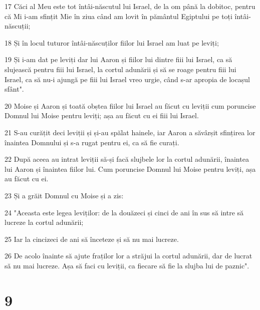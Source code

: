 \par 17 Căci al Meu este tot întâi-născutul lui Israel, de la om până la dobitoc, pentru că Mi i-am sfințit Mie în ziua când am lovit în pământul Egiptului pe toți întâi-născuții;
\par 18 Și în locul tuturor întâi-născuților fiilor lui Israel am luat pe leviți;
\par 19 Și i-am dat pe leviți dar lui Aaron și fiilor lui dintre fiii lui Israel, ca să slujească pentru fiii lui Israel, la cortul adunării și să se roage pentru fiii lui Israel, ca să nu-i ajungă pe fiii lui Israel vreo urgie, când s-ar apropia de locașul sfânt".
\par 20 Moise și Aaron și toată obștea fiilor lui Israel au făcut cu leviții cum poruncise Domnul lui Moise pentru leviți; așa au făcut cu ei fiii lui Israel.
\par 21 S-au curățit deci leviții și și-au spălat hainele, iar Aaron a săvârșit sfințirea lor înaintea Domnului și s-a rugat pentru ei, ca să fie curați.
\par 22 După aceea au intrat leviții să-și facă slujbele lor la cortul adunării, înaintea lui Aaron și înaintea fiilor lui. Cum poruncise Domnul lui Moise pentru leviți, așa au făcut cu ei.
\par 23 Și a grăit Domnul cu Moise și a zis:
\par 24 "Aceasta este legea leviților: de la douăzeci și cinci de ani în sus să intre să lucreze la cortul adunării;
\par 25 Iar la cincizeci de ani să înceteze și să nu mai lucreze.
\par 26 De acolo înainte să ajute fraților lor a străjui la cortul adunării, dar de lucrat să nu mai lucreze. Așa să faci cu leviții, ca fiecare să fie la slujba lui de paznic".

\chapter{9}

